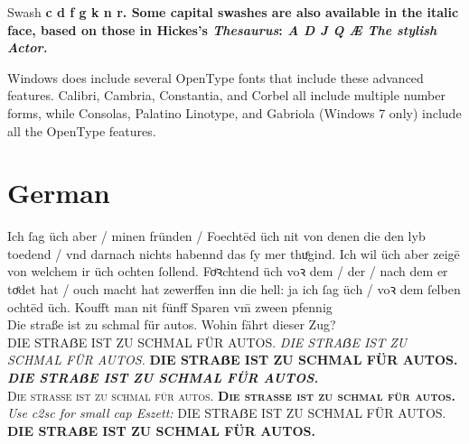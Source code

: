 \begin{scriptexample}[]{Swash}
\Large\bfseries
{
\textbf{c d f g k n r}.  Some capital swashes are also
available in the italic face, based on those in Hickes's \textit{Thesaurus}:
\textit{A D J Q Æ
  The stylish Actor.}  
}
\end{scriptexample}

Windows does include several OpenType fonts that include these advanced features.  Calibri, Cambria, Constantia, and Corbel all include multiple number forms, while Consolas, Palatino Linotype, and Gabriola (Windows 7 only) include all the OpenType features. 

{
\Large
{}
\lorem

\lorem

\lorem

\lorem
}

{
\large
{}

\lorem

\textit{\fox}
\textbf{\fox}
\textsc{\fox}
}



\section{German}
\newcommand{\salt}[1]{{\addfontfeatures{Alternate=0}{#1}}}
\newcommand{\saltb}[1]{{\addfontfeatures{Alternate=1}{#1}}}
Ich ſag üch aber / minen fründen / Foechtēd üch nit von denen die den
lyb toedend / vnd darnach nichts habennd das ſy mer thuͤgind. Ich wil
üch aber zeigē von welchem ir üch \saltb{f}ochten ſollend. Foͤꝛchtend üch voꝛ
dem / der / nach dem er toͤdet hat / ouch macht hat zewerffen inn die
hell: ja ich ſag üch / voꝛ dem ſelben \saltb{f}ochtēd üch. Koufft man nit
fünff Sparen vm̄ zween pfennig\\[1ex]
{\Large Die straße ist zu schmal für autos. Wohin fährt dieser Zug?}\\
DIE STRAẞE IST ZU SCHMAL FÜR AUTOS.
{\itshape DIE STRAẞE IST ZU SCHMAL FÜR AUTOS.}
{\bfseries DIE STRAẞE IST ZU SCHMAL FÜR AUTOS.}
{\itshape\bfseries DIE STRAẞE IST ZU SCHMAL FÜR AUTOS.}\\[1ex]
{\scshape Die straße ist zu schmal für autos.
\bfseries Die straße ist zu schmal für autos.}
{\itshape Use c2sc for small cap Eszett:}
{DIE STRAẞE IST ZU SCHMAL FÜR AUTOS.
\bfseries DIE STRAẞE IST ZU SCHMAL FÜR AUTOS.}

